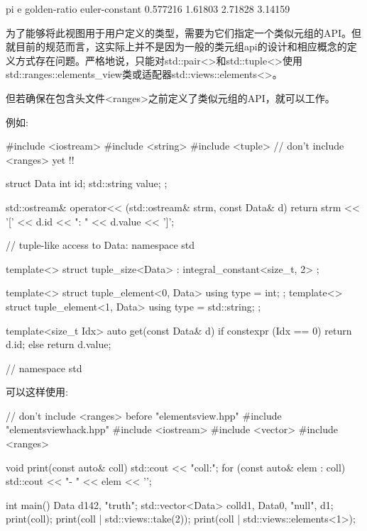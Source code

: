 \begin{shell}
pi e golden-ratio euler-constant
0.577216 1.61803 2.71828 3.14159
\end{shell}


为了能够将此视图用于用户定义的类型，需要为它们指定一个类似元组的API。但就目前的规范而言，这实际上并不是因为一般的类元组api的设计和相应概念的定义方式存在问题。严格地说，只能对std::pair<>和std::tuple<>使用std::ranges::elements\_view类或适配器std::views::elements<>。

但若确保在包含头文件<ranges>之前定义了类似元组的API，就可以工作。

例如:


\begin{cpp}
#include <iostream>
#include <string>
#include <tuple>
// don’t include <ranges> yet !!

struct Data {
	int id;
	std::string value;
};

std::ostream& operator<< (std::ostream& strm, const Data& d) {
	return strm << '[' << d.id << ": " << d.value << ']';
}

// tuple-like access to Data:
namespace std {
	template<>
	struct tuple_size<Data> : integral_constant<size_t, 2> {
	};
	
	template<>
	struct tuple_element<0, Data> {
		using type = int;
	};
	template<>
	struct tuple_element<1, Data> {
		using type = std::string;
	};
	
	template<size_t Idx> auto get(const Data& d) {
		if constexpr (Idx == 0) {
			return d.id;
		}
		else {
			return d.value;
		}
	}
} // namespace std
\end{cpp}

可以这样使用:


\begin{cpp}
// don’t include <ranges> before "elementsview.hpp"
#include "elementsviewhack.hpp"
#include <iostream>
#include <vector>
#include <ranges>

void print(const auto& coll)
{
	std::cout << "coll:\n";
	for (const auto& elem : coll) {
		std::cout << "- " << elem << '\n';
	}
}

int main()
{
	Data d1{42, "truth"};
	std::vector<Data> coll{d1, Data{0, "null"}, d1};
	print(coll);
	print(coll | std::views::take(2));
	print(coll | std::views::elements<1>);
}
\end{cpp}

